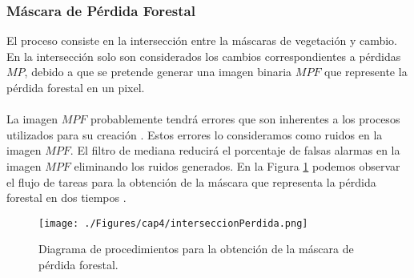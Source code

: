 \subsubsection{M\'ascara de P\'erdida Forestal}
El proceso consiste en la intersecci\'on entre la m\'ascaras de vegetaci\'on y cambio. En la intersecci\'on solo son considerados los cambios correspondientes a p\'erdidas  $ MP $, debido a que se pretende generar una imagen binaria $ MPF $ que represente la p\'erdida forestal en un pixel.\\~\\
La imagen $ MPF $ probablemente tendr\'a errores que son inherentes a los procesos utilizados para su creaci\'on \cite{lovell2001filtering}. Estos errores lo consideramos como ruidos en la imagen $ MPF $. El filtro de mediana \cite{gonzalez2002woods} reducir\'a el porcentaje de falsas alarmas en la imagen $ MPF $ eliminando los ruidos generados.
En la Figura \ref{fig:intersPerdida} podemos observar el flujo de tareas para la obtenci\'on de la m\'ascara que representa la p\'erdida forestal en dos tiempos .
\begin{figure}[H]
	\centering
	\texttt{[image: ./Figures/cap4/interseccionPerdida.png]}
	\caption{Diagrama de procedimientos para la obtenci\'on de la m\'ascara de p\'erdida forestal.}
	\label{fig:intersPerdida}
\end{figure}

